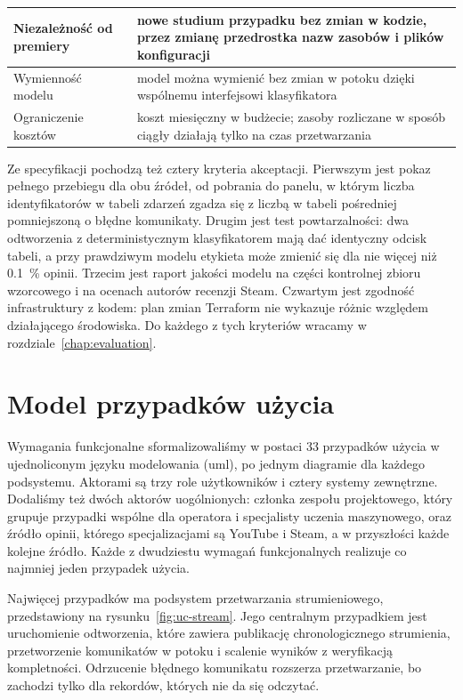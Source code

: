 \begin{table}[hbp]
\begin{tabular}{|p{}|p{}|}
    \hline
    Niezależność od premiery     & nowe studium przypadku bez zmian w kodzie, przez zmianę przedrostka nazw zasobów i plików konfiguracji                                             \\
    \hline
    Wymienność modelu            & model można wymienić bez zmian w potoku dzięki wspólnemu interfejsowi klasyfikatora                                                                 \\
    \hline
    Ograniczenie kosztów         & koszt miesięczny w budżecie; zasoby rozliczane w sposób ciągły działają tylko na czas przetwarzania                                                 \\
    \hline
  \end{tabular}
\end{table}

Ze specyfikacji pochodzą też cztery kryteria akceptacji.
Pierwszym jest pokaz pełnego przebiegu dla obu źródeł, od pobrania do panelu, w którym liczba identyfikatorów w tabeli zdarzeń zgadza się z liczbą w tabeli pośredniej pomniejszoną o błędne komunikaty.
Drugim jest test powtarzalności: dwa odtworzenia z deterministycznym klasyfikatorem mają dać identyczny odcisk tabeli, a przy prawdziwym modelu etykieta może zmienić się dla nie więcej niż \qty{0.1}{\percent} opinii.
Trzecim jest raport jakości modelu na części kontrolnej zbioru wzorcowego i na ocenach autorów recenzji Steam.
Czwartym jest zgodność infrastruktury z kodem: plan zmian Terraform nie wykazuje różnic względem działającego środowiska.
Do każdego z tych kryteriów wracamy w rozdziale~\ref{chap:evaluation}.

\section{Model przypadków użycia}
\label{sec:req-use-cases}

Wymagania funkcjonalne sformalizowaliśmy w postaci 33 przypadków użycia w ujednoliconym języku modelowania (\ac{uml}), po jednym diagramie dla każdego podsystemu.
Aktorami są trzy role użytkowników i cztery systemy zewnętrzne.
Dodaliśmy też dwóch aktorów uogólnionych: członka zespołu projektowego, który grupuje przypadki wspólne dla operatora i specjalisty uczenia maszynowego, oraz źródło opinii, którego specjalizacjami są YouTube i Steam, a w przyszłości każde kolejne źródło.
Każde z dwudziestu wymagań funkcjonalnych realizuje co najmniej jeden przypadek użycia.

Najwięcej przypadków ma podsystem przetwarzania strumieniowego, przedstawiony na rysunku~\ref{fig:uc-stream}.
Jego centralnym przypadkiem jest uruchomienie odtworzenia, które zawiera publikację chronologicznego strumienia, przetworzenie komunikatów w potoku i scalenie wyników z weryfikacją kompletności.
Odrzucenie błędnego komunikatu rozszerza przetwarzanie, bo zachodzi tylko dla rekordów, których nie da się odczytać.

